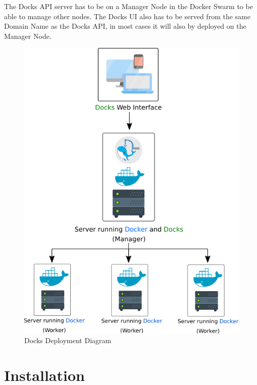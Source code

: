 \documentclass[]{article}
\begin{document}
The Docks API server has to be on a Manager Node in the Docker Swarm to be able to manage other nodes. The Docks UI also has to be served from the same Domain Name as the Docks API, in most cases it will also by deployed on the Manager Node.

\begin{figure}[h!]
	\centering
	\includegraphics[scale=0.8]{deployment_diagram.png}
	\caption{Docks Deployment Diagram}
\end{figure}

\pagebreak

\section{Installation}
\end{document}
